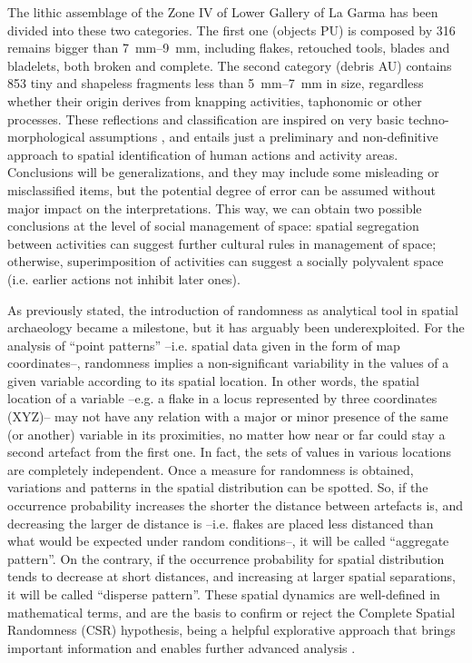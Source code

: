 The lithic assemblage of the Zone IV of Lower Gallery of La Garma has been divided into these two categories. The first one (objects PU) is composed by 316 remains bigger than \SIrange{7}{9}{\milli\meter}, including flakes, retouched tools, blades and bladelets, both broken and complete. The second category (debris AU) contains 853 tiny and shapeless fragments less than \SIrange{5}{7}{\milli\meter} in size, regardless whether their origin derives from knapping activities, taphonomic or other processes. These reflections and classification are inspired on very basic techno-morphological assumptions \parencites[see][]{Carbonell_1992}{Inizan_1999}{Mora_1992}, and entails just a preliminary and non-definitive approach to spatial identification of human actions and activity areas. 
Conclusions will be generalizations, and they may include some misleading or misclassified items, but the potential degree of error can be assumed without major impact on the interpretations. This way, we can obtain two possible conclusions at the level of social management of space: spatial segregation between activities can suggest further cultural rules in management of space; otherwise, superimposition of activities can suggest a socially polyvalent space (i.e. earlier actions not inhibit later ones).


As previously stated, the introduction of randomness as analytical tool in spatial archaeology became a milestone, but it has arguably been underexploited. For the analysis of “point patterns” –i.e. spatial data given in the form of map coordinates–, randomness implies a non-significant variability in the values of a given variable according to its spatial location. In other words, the spatial location of a variable –e.g. a flake in a locus represented by three coordinates (XYZ)– may not have any relation with a major or minor presence of the same (or another) variable in its proximities, no matter how near or far could stay a second artefact from the first one. In fact, the sets of values in various locations are completely independent. Once a measure for randomness is obtained, variations and patterns in the spatial distribution can be spotted. So, if the occurrence probability increases the shorter the distance between artefacts is, and decreasing the larger de distance is –i.e. flakes are placed less distanced than what would be expected under random conditions–, it will be called “aggregate pattern”. On the contrary, if the occurrence probability for spatial distribution tends to decrease at short distances, and increasing at larger spatial separations, it will be called “disperse pattern”. These spatial dynamics are well-defined in mathematical terms, and are the basis to confirm or reject the Complete Spatial Randomness (CSR) hypothesis, being a helpful explorative approach that brings important information and enables further advanced analysis \parencites{Bailey_1995}{Bevan_2013}{Illian_2008}{Maximiano_2008}.

